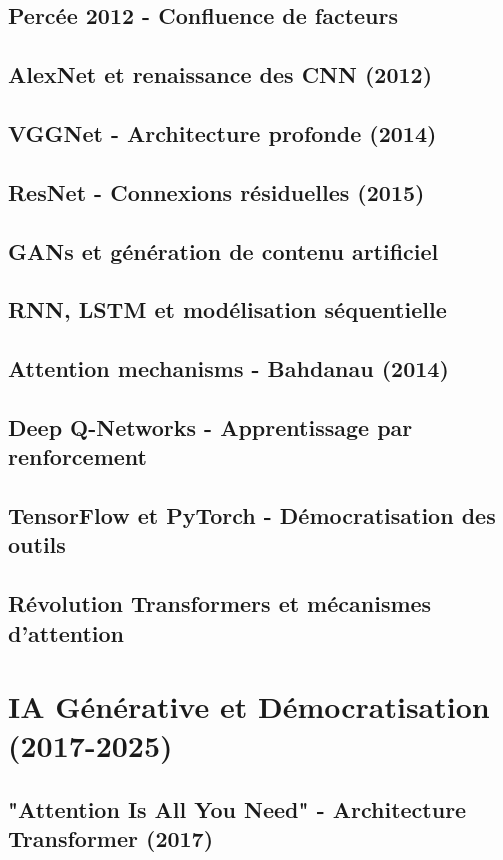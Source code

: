 \documentclass[12pt,a4paper]{book}
\begin{document}
\section{Percée 2012 - Confluence de facteurs}
\section{AlexNet et renaissance des CNN (2012)}
\section{VGGNet - Architecture profonde (2014)}
\section{ResNet - Connexions résiduelles (2015)}
\section{GANs et génération de contenu artificiel}
\section{RNN, LSTM et modélisation séquentielle}
\section{Attention mechanisms - Bahdanau (2014)}
\section{Deep Q-Networks - Apprentissage par renforcement}
\section{TensorFlow et PyTorch - Démocratisation des outils}
\section{Révolution Transformers et mécanismes d'attention}

\chapter{IA Générative et Démocratisation (2017-2025)}
\section{"Attention Is All You Need" - Architecture Transformer (2017)}
\end{document}
